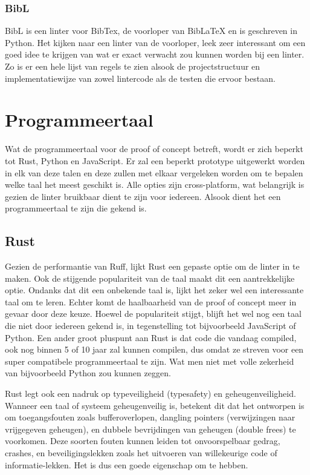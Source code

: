 \subsubsection{BibL}
BibL is een linter voor BibTex, de voorloper van BibLaTeX en is geschreven in Python. Het kijken naar een linter van de voorloper, leek zeer interessant om een goed idee te krijgen van wat er exact verwacht zou kunnen worden bij een linter. Zo is er een hele lijst van regels te zien alsook de projectstructuur en implementatiewijze van zowel lintercode als de testen die ervoor bestaan.\autocite{VanDenKerchove2020}

\section{Programmeertaal}

Wat de programmeertaal voor de proof of concept betreft, wordt er zich beperkt tot Rust, Python en JavaScript. Er zal een beperkt prototype uitgewerkt worden in elk van deze talen en deze zullen met elkaar vergeleken worden om te bepalen welke taal het meest geschikt is. Alle opties zijn cross-platform, wat belangrijk is gezien de linter bruikbaar dient te zijn voor iedereen. Alsook dient het een programmeertaal te zijn die gekend is.

\subsection{Rust}
Gezien de performantie van Ruff, lijkt Rust een gepaste optie om de linter in te maken. Ook de stijgende populariteit van de taal maakt dit een aantrekkelijke optie. Ondanks dat dit een onbekende taal is, lijkt het zeker wel een interessante taal om te leren. Echter komt de haalbaarheid van de proof of concept meer in gevaar door deze keuze. Hoewel de populariteit stijgt, blijft het wel nog een taal die niet door iedereen gekend is, in tegenstelling tot bijvoorbeeld JavaScript of Python. Een ander groot pluspunt aan Rust is dat code die vandaag compiled, ook nog binnen 5 of 10 jaar zal kunnen compilen, dus omdat ze streven voor een super compatibele programmeertaal te zijn. Wat men niet met volle zekerheid van bijvoorbeeld Python zou kunnen zeggen. 
 
Rust legt ook een nadruk op typeveiligheid (typesafety) en geheugenveiligheid. Wanneer een taal of systeem geheugenveilig is, betekent dit dat het ontworpen is om toegangsfouten zoals bufferoverlopen, dangling pointers (verwijzingen naar vrijgegeven geheugen), en dubbele bevrijdingen van geheugen (double frees) te voorkomen. Deze soorten fouten kunnen leiden tot onvoorspelbaar gedrag, crashes, en beveiligingslekken zoals het uitvoeren van willekeurige code of informatie-lekken. Het is dus een goede eigenschap om te hebben.\autocite{Klabnik2022}

